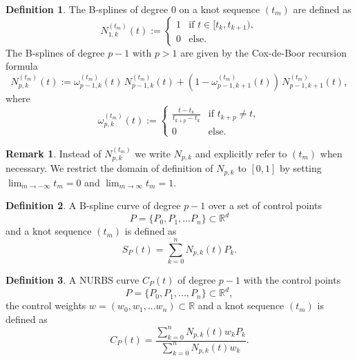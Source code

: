 \documentclass[a4paper, 11pt]{report}
\theoremstyle{definition}
\newtheorem{definition}{Definition}[section]
\newtheorem*{remark}{Remark}
\begin{document}
	\begin{definition}
		The B-splines of degree $0$ on a knot sequence $(t_m)$ are defined as
		\begin{equation}
			N^{(t_m)}_{1,k}(t) :=
			\begin{cases}
				1 & \text{if } t \in [t_k, t_{k+1}),\\
				0 & \text{else.}
			\end{cases}
		\end{equation}
		The B-splines of degree $p-1$ with $p > 1$ are given by the Cox-de-Boor recursion formula
		\begin{equation}\label{eq:coxdeboorrec}
			N_{p,k}^{(t_m)}(t) := \omega^{(t_m)}_{p-1, k}(t) \, N^{(t_m)}_{p-1, k}(t) + (1-\omega^{(t_m)}_{p-1, k+1}(t)) \, N^{(t_m)}_{p-1, k+1}(t),
		\end{equation}
		where
		\begin{equation}
			\omega^{(t_m)}_{p,k}(t) := 
			\begin{cases}
				\frac{t-t_k}{t_{k+p} - t_k} &\text{if } t_{k+p} \neq t,\\
				0 							&\text{else.}
			\end{cases}
		\end{equation}
	\end{definition}

	\begin{remark}
		Instead of $N_{p,k}^{(t_m)}$ we write $N_{p,k}$ and explicitly refer to $(t_m)$ when necessary. We restrict the domain of definition of $N_{p,k}$ to $[0, 1]$ by setting $\lim_{m \to -\infty} t_m = 0$ and $\lim_{m \to \infty} t_m = 1$.
	\end{remark}

	\begin{definition}
		A B-spline curve of degree $p-1$ over a set of control points
			$$P = \{P_0, P_1, ... P_n\} \subset \mathbb{R}^d$$
		and a knot sequence $(t_m)$ is defined as
			$$ S_P(t) = \sum_{k=0}^{n} N_{p,k}(t) P_k.$$
	\end{definition}

	\begin{definition}\label{def:nurbs}
		A NURBS curve $C_P(t)$ of degree $p-1$ with the control points 
			$$P = \{P_0, P_1, ..., P_n\} \subset \mathbb{R}^d,$$ 
		the control weights $w = (w_0, w_1, ... w_n) \subset \mathbb{R}$ and a knot sequence $(t_m)$ is defined as
		\begin{equation}
			C_P(t) = \frac{\sum_{k=0}^n N_{p,k}(t) w_k P_k}{\sum_{k=0}^n N_{p,k}(t) w_k}.
		\end{equation}
	\end{definition}
\end{document}
